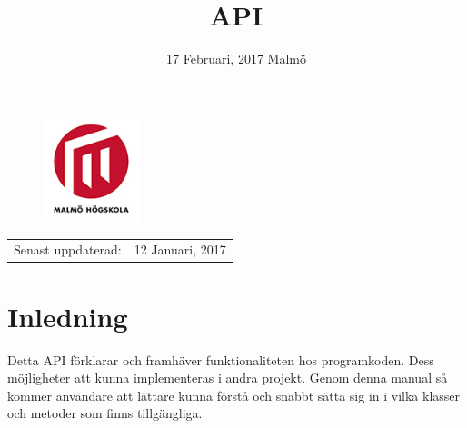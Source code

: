 \documentclass[11pt, numbers=endperiod]{article}
\title{API} %
\author{}%
\date{17 Februari, 2017 Malmö} %
\begin{document}
\begin{titlepage}


\clearpage\maketitle %
\thispagestyle{empty}

\begin{figure}[h]
	\begin{center}
		\includegraphics[width=0.25\textwidth]{MAH_logotyp_original}
	\end{center}
\end{figure}

\begin{center}
\begin{tabular}{l r}
Senast uppdaterad: & 12 Januari, 2017 \\ %
\end{tabular}
\end{center}

\end{titlepage}

\clearpage


\tableofcontents

\thispagestyle{empty}\newpage
\setcounter{page}{1}


\section{Inledning}
Detta API förklarar och framhäver funktionaliteten hos programkoden. Dess möjligheter att kunna implementeras i andra projekt. Genom denna manual så kommer användare att lättare kunna förstå och snabbt sätta sig in i vilka klasser och metoder som finns tillgängliga.\\
\end{document}
